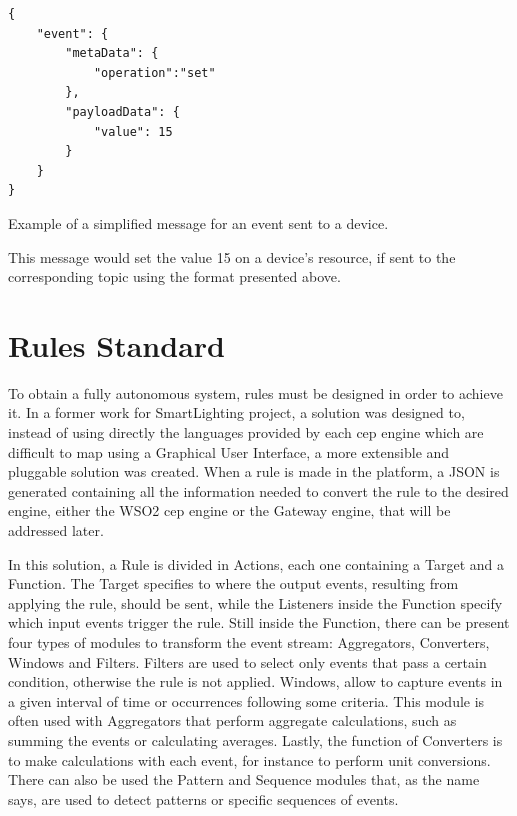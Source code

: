 \begin{listing}[H]
\begin{verbatim}
{
    "event": {
        "metaData": {
            "operation":"set"
        }, 
        "payloadData": {
            "value": 15 
        }
    } 
}

\end{verbatim}
\caption{Example of a simplified message for an event sent to a device.}
\label{snippet:todevice}
\end{listing}

This message would set the value 15 on a device's resource, if sent to the corresponding topic using the format presented above.

\section{Rules Standard}
\label{implementation:rules}


To obtain a fully autonomous system, rules must be designed in order to achieve it. In a former work for SmartLighting project\cite{helder}, a solution was designed to, instead of using directly the languages provided by each \ac{cep} engine which are difficult to map using a Graphical User Interface, a more extensible and pluggable solution was created. When a rule is made in the platform, a JSON is generated containing all the information needed to convert the rule to the desired engine, either the WSO2 \ac{cep} engine or the Gateway engine, that will be addressed later.

In this solution, a Rule is divided in Actions, each one containing a Target and a Function. The Target specifies to where the output events, resulting from applying the rule, should be sent, while the Listeners inside the Function specify which input events trigger the rule. Still inside the Function, there can be present four types of modules to transform the event stream: Aggregators, Converters, Windows and Filters. Filters are used to select only events that pass a certain condition, otherwise the rule is not applied. Windows, allow to capture events in a given interval of time or occurrences following some criteria. This module is often used with Aggregators that perform aggregate calculations, such as summing the events or calculating averages. Lastly, the function of Converters is to make calculations with each event, for instance to perform unit conversions. There can also be used the Pattern and Sequence modules that, as the name says, are used to detect patterns or specific sequences of events.


